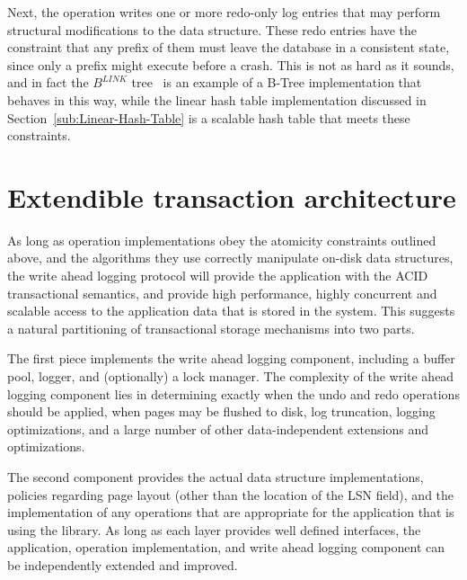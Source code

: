 \documentclass[letterpaper,twocolumn,english]{article}
\begin{document}
Next, the operation writes one or more redo-only log entries that may perform structural
modifications to the data structure. These redo entries have the constraint that any prefix of them must leave the database in a consistent state, since only a prefix might execute before a crash.  This is not as hard as it sounds, and in fact the
$B^{LINK}$ tree~\cite{blink} is an example of a B-Tree implementation
that behaves in this way, while the linear hash table implementation
discussed in Section~\ref{sub:Linear-Hash-Table} is a scalable 
hash table that meets these constraints.


\section{Extendible transaction architecture}

As long as operation implementations obey the atomicity constraints
outlined above, and the algorithms they use correctly manipulate
on-disk data structures, the write ahead logging protocol will provide
the application with the ACID transactional semantics, and provide
high performance, highly concurrent and scalable access to the
application data that is stored in the system.  This suggests a
natural partitioning of transactional storage mechanisms into two
parts.

The first piece implements the write ahead logging component,
including a buffer pool, logger, and (optionally) a lock manager.  
The complexity of the write ahead logging component lies in
determining exactly when the undo and redo operations should be
applied, when pages may be flushed to disk, log truncation, logging
optimizations, and a large number of other data-independent extensions
and optimizations.

The second component provides the actual data structure
implementations, policies regarding page layout (other than the
location of the LSN field), and the implementation of any operations
that are appropriate for the application that is using the library.
As long as each layer provides well defined interfaces, the application, 
operation implementation, and write ahead logging component can be 
independently extended and improved.
\end{document}
